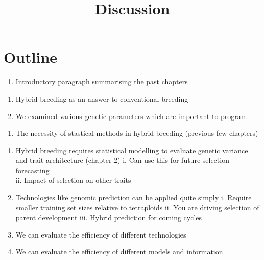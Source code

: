 \documentclass[
]{report}
\title{Discussion}
\author{}
\date{}
\providecommand{\tightlist}{%
  \setlength{\itemsep}{0pt}\setlength{\parskip}{0pt}}\usepackage{longtable,booktabs,array}
\begin{document}
\maketitle
\ifdefined\Shaded\renewenvironment{Shaded}{\begin{tcolorbox}[borderline west={3pt}{0pt}{shadecolor}, boxrule=0pt, frame hidden, interior hidden, breakable, enhanced, sharp corners]}{\end{tcolorbox}}\fi

\hypertarget{outline}{%
\chapter{Outline}\label{outline}}

\begin{enumerate}
\def\labelenumi{\arabic{enumi}.}
\tightlist
\item
  Introductory paragraph summarising the past chapters
\end{enumerate}

\begin{enumerate}
\def\labelenumi{\alph{enumi}.}
\tightlist
\item
  Hybrid breeding as an answer to conventional breeding
\item
  We examined various genetic parameters which are important to program
\end{enumerate}

\begin{enumerate}
\def\labelenumi{\arabic{enumi}.}
\setcounter{enumi}{1}
\tightlist
\item
  The necessity of stastical methods in hybrid breeding (previous few
  chapters)
\end{enumerate}

\begin{enumerate}
\def\labelenumi{\alph{enumi}.}
\tightlist
\item
  Hybrid breeding requires statistical modelling to evaluate genetic
  variance and trait architecture (chapter 2) i. Can use this for future
  selection forecasting\\
  ii. Impact of selection on other traits
\item
  Technologies like genomic prediction can be applied quite simply i.
  Require smaller training set sizes relative to tetraploids ii. You are
  driving selection of parent development iii. Hybrid prediction for
  coming cycles
\item
  We can evaluate the efficiency of different technologies
\item
  We can evaluate the efficiency of different models and information
\end{enumerate}
\end{document}
